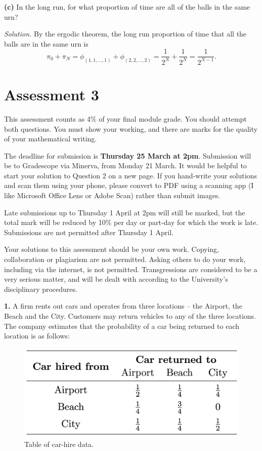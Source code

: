 \documentclass[
  a4paper,
]{article}
\theoremstyle{definition}
\theoremstyle{definition}
\theoremstyle{definition}
\theoremstyle{remark}
\begin{document}
\textbf{(c)}
In the long run, for what proportion of time are all of the balls in the same urn?

\begin{myanswers}
\emph{Solution.} By the ergodic theorem, the long run proportion of time that all the balls are in the same urn is
\[ \pi_0 + \pi_N = \phi_{(1,1,\dots,1)} + \phi_{(2,2,\dots,2)} = \frac{1}{2^N} + \frac{1}{2^N} = \frac{1}{2^{N-1}} . \]

\end{myanswers}

\hypertarget{A3}{%
\section*{Assessment 3}\label{A3}}

This assessment counts as 4\% of your final module grade. You should attempt both questions. You must show your working, and there are marks for the quality of your mathematical writing.

The deadline for submission is \textbf{Thursday 25 March at 2pm}. Submission will be to Gradescope via Minerva, from Monday 21 March. It would be helpful to start your solution to Question 2 on a new page. If you hand-write your solutions and scan them using your phone, please convert to PDF using a scanning app (I like Microsoft Office Lens or Adobe Scan) rather than submit images.

Late submissions up to Thursday 1 April at 2pm will still be marked, but the total mark will be reduced by 10\% per day or part-day for which the work is late. Submissions are not permitted after Thursday 1 April.

Your solutions to this assessment should be your own work. Copying, collaboration or plagiarism are not permitted. Asking others to do your work, including via the internet, is not permitted. Transgressions are considered to be a very serious matter, and will be dealt with according to the University's disciplinary procedures.

\textbf{1.}
A firm rents out cars and operates from three locations -- the Airport, the Beach and the
City. Customers may return vehicles to any of the three locations.
The company estimates that the probability of a car being returned to each location is
as follows:

\begin{figure}

{\centering \includegraphics[width=0.5\linewidth]{assessments/car-hire} 

}

\caption{Table of car-hire data.}\label{fig:car-table}
\end{figure}
\end{document}

